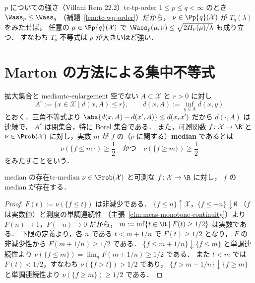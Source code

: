 \begin{remark}{$p$ についての強さ（Villani Rem 22.2）}{tc-tp-order}
  $1\leq p\leq q<\infty$ のとき $\Wass_p\leq\Wass_q$
  （補題~\ref{lem:tc-wp-order}）だから，
  $\nu\in\Pp{q}(\mathcal{X})$ が $T_q(\lambda)$ をみたせば，
  任意の $\mu\in\Pp{q}(\mathcal{X})$ で
  $\Wass_p(\mu,\nu)\leq\sqrt{2H_\nu(\mu)/\lambda}$ も成り立つ．
  すなわち $T_p$ 不等式は $p$ が大きいほど強い．
\end{remark}

\section{Marton の方法による集中不等式}
\label{sec:tc-concentration}

\begin{definition}{拡大集合と median}{tc-enlargement}
  空でない $A\subset\mathcal{X}$ と $r>0$ に対し
  \[
    A^r:=\{x\in\mathcal{X}\mid d(x,A)\leq r\},
    \qquad
    d(x,A):=\inf_{y\in A}d(x,y)
  \]
  とおく．三角不等式より
  $\abs{d(x,A)-d(x',A)}\leq d(x,x')$ だから $d(\cdot,A)$ は連続で，
  $A^r$ は閉集合，特に Borel 集合である．
  また，可測関数 $f\colon\mathcal{X}\to\R$ と
  $\nu\in\Prob(\mathcal{X})$ に対し，実数 $m$ が
  $f$ の（$\nu$ に関する）\textbf{median} であるとは
  \[
    \nu(\{f\leq m\})\geq\frac12
    \quad\text{かつ}\quad
    \nu(\{f\geq m\})\geq\frac12
  \]
  をみたすことをいう．
\end{definition}

\begin{lemma}{median の存在}{tc-median}
  $\nu\in\Prob(\mathcal{X})$ と可測な $f\colon\mathcal{X}\to\R$ に対し，
  $f$ の median が存在する．
\end{lemma}

\begin{proof}
  $F(t):=\nu(\{f\leq t\})$ は非減少である．
  $\{f\leq n\}\uparrow\mathcal{X}$，$\{f\leq-n\}\downarrow\emptyset$
  （$f$ は実数値）と測度の単調連続性
  （主張~\ref{clm:meas-monotone-continuity}）より
  $F(n)\to1$，$F(-n)\to0$ だから，
  $m:=\inf\{t\in\R\mid F(t)\geq1/2\}$ は実数である．
  下限の定義より，各 $n$ である $t<m+1/n$ で $F(t)\geq1/2$ となり，
  $F$ の非減少性から $F(m+1/n)\geq1/2$ である．
  $\{f\leq m+1/n\}\downarrow\{f\leq m\}$ と単調連続性より
  $\nu(\{f\leq m\})=\lim_nF(m+1/n)\geq1/2$ である．
  また $t<m$ では $F(t)<1/2$，すなわち $\nu(\{f>t\})>1/2$ であり，
  $\{f>m-1/n\}\downarrow\{f\geq m\}$ と単調連続性より
  $\nu(\{f\geq m\})\geq1/2$ である．
\end{proof}

